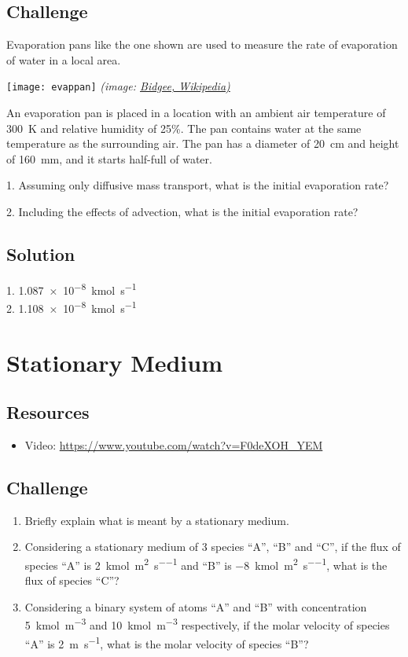 \subsection*{Challenge}
Evaporation pans like the one shown are used to measure the rate of evaporation of water in a local area.

\texttt{[image: evappan]}
\emph{(image: \href{https://commons.wikimedia.org/wiki/File:Evaporation_Pan.jpg}{Bidgee, Wikipedia)}}

An evaporation pan is placed in a location with an ambient air temperature of \SI{300}{\kelvin} and relative humidity of 25\%. The pan contains water at the same temperature as the surrounding air. The pan has a diameter of \SI{20}{\cm} and height of \SI{160}{\mm}, and it starts half-full of water.

1. Assuming only diffusive mass transport, what is the initial evaporation rate?

2. Including the effects of advection, what is the initial evaporation rate?


\subsection*{Solution}
1. \SI{1.087e-8}{\kilo\mol\per\second}\\
2. \SI{1.108e-8}{\kilo\mol\per\second}





\newpage
\section{Stationary Medium}

\subsection*{Resources}
\begin{itemize}
    \item Video: \url{https://www.youtube.com/watch?v=F0deXOH_YEM}
\end{itemize}

\subsection*{Challenge}
\begin{enumerate}
    \item Briefly explain what is meant by a stationary medium.
    \item Considering a stationary medium of 3 species ``A'', ``B'' and ``C'', if the flux of species ``A'' is \SI{2}{\kmol\per\square\meter\per\second} and ``B'' is \SI{-8}{\kmol\per\square\meter\per\second}, what is the flux of species ``C''?
    \item Considering a binary system of atoms ``A'' and ``B'' with concentration \SI{5}{\kmol\per\cubic\meter} and \SI{10}{\kmol\per\cubic\meter} respectively, if the molar velocity of species ``A'' is \SI{2}{\meter\per\second}, what is the molar velocity of species ``B''?
\end{enumerate}



